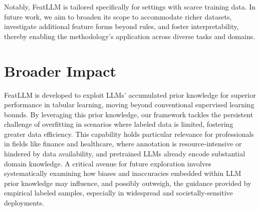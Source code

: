 Notably, \textsf{FeatLLM} is tailored specifically for settings with scarce training data. In future work, we aim to broaden its scope to accommodate richer datasets, investigate additional feature forms beyond rules, and foster interpretability, thereby enabling the methodology’s application across diverse tasks and domains.

\section{Broader Impact}
\textsf{FeatLLM} is developed to exploit LLMs’ accumulated prior knowledge for superior performance in tabular learning, moving beyond conventional supervised learning bounds. By leveraging this prior knowledge, our framework tackles the persistent challenge of overfitting in scenarios where labeled data is limited, fostering greater data efficiency. This capability holds particular relevance for professionals in fields like finance and healthcare, where annotation is resource-intensive or hindered by data availability, and pretrained LLMs already encode substantial domain knowledge. A critical avenue for future exploration involves systematically examining how biases and inaccuracies embedded within LLM prior knowledge may influence, and possibly outweigh, the guidance provided by empirical labeled samples, especially in widespread and societally-sensitive deployments.

